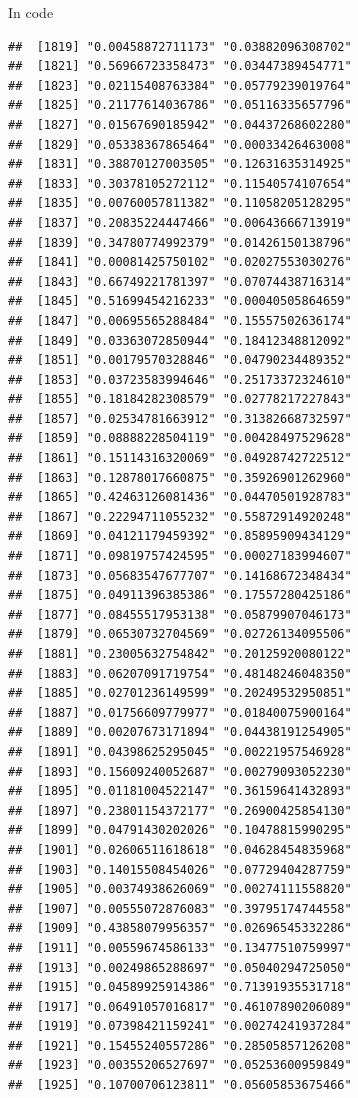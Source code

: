 \documentclass[ignorenonframetext,]{beamer}
\begin{document}
\begin{frame}[fragile]{In code}
\begin{verbatim}
##  [1819] "0.00458872711173" "0.03882096308702"
##  [1821] "0.56966723358473" "0.03447389454771"
##  [1823] "0.02115408763384" "0.05779239019764"
##  [1825] "0.21177614036786" "0.05116335657796"
##  [1827] "0.01567690185942" "0.04437268602280"
##  [1829] "0.05338367865464" "0.00033426463008"
##  [1831] "0.38870127003505" "0.12631635314925"
##  [1833] "0.30378105272112" "0.11540574107654"
##  [1835] "0.00760057811382" "0.11058205128295"
##  [1837] "0.20835224447466" "0.00643666713919"
##  [1839] "0.34780774992379" "0.01426150138796"
##  [1841] "0.00081425750102" "0.02027553030276"
##  [1843] "0.66749221781397" "0.07074438716314"
##  [1845] "0.51699454216233" "0.00040505864659"
##  [1847] "0.00695565288484" "0.15557502636174"
##  [1849] "0.03363072850944" "0.18412348812092"
##  [1851] "0.00179570328846" "0.04790234489352"
##  [1853] "0.03723583994646" "0.25173372324610"
##  [1855] "0.18184282308579" "0.02778217227843"
##  [1857] "0.02534781663912" "0.31382668732597"
##  [1859] "0.08888228504119" "0.00428497529628"
##  [1861] "0.15114316320069" "0.04928742722512"
##  [1863] "0.12878017660875" "0.35926901262960"
##  [1865] "0.42463126081436" "0.04470501928783"
##  [1867] "0.22294711055232" "0.55872914920248"
##  [1869] "0.04121179459392" "0.85895909434129"
##  [1871] "0.09819757424595" "0.00027183994607"
##  [1873] "0.05683547677707" "0.14168672348434"
##  [1875] "0.04911396385386" "0.17557280425186"
##  [1877] "0.08455517953138" "0.05879907046173"
##  [1879] "0.06530732704569" "0.02726134095506"
##  [1881] "0.23005632754842" "0.20125920080122"
##  [1883] "0.06207091719754" "0.48148246048350"
##  [1885] "0.02701236149599" "0.20249532950851"
##  [1887] "0.01756609779977" "0.01840075900164"
##  [1889] "0.00207673171894" "0.04438191254905"
##  [1891] "0.04398625295045" "0.00221957546928"
##  [1893] "0.15609240052687" "0.00279093052230"
##  [1895] "0.01181004522147" "0.36159641432893"
##  [1897] "0.23801154372177" "0.26900425854130"
##  [1899] "0.04791430202026" "0.10478815990295"
##  [1901] "0.02606511618618" "0.04628454835968"
##  [1903] "0.14015508454026" "0.07729404287759"
##  [1905] "0.00374938626069" "0.00274111558820"
##  [1907] "0.00555072876083" "0.39795174744558"
##  [1909] "0.43858079956357" "0.02696545332286"
##  [1911] "0.00559674586133" "0.13477510759997"
##  [1913] "0.00249865288697" "0.05040294725050"
##  [1915] "0.04589925914386" "0.71391935531718"
##  [1917] "0.06491057016817" "0.46107890206089"
##  [1919] "0.07398421159241" "0.00274241937284"
##  [1921] "0.15455240557286" "0.28505857126208"
##  [1923] "0.00355206527697" "0.05253600959849"
##  [1925] "0.10700706123811" "0.05605853675466"

\end{verbatim}
\end{frame}
\end{document}
